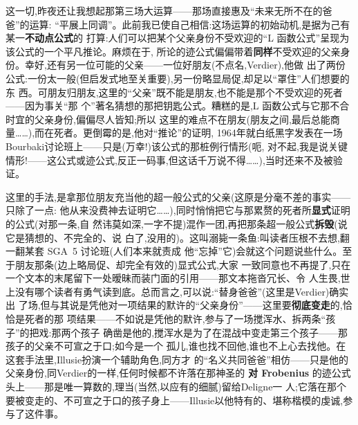 \pmark 这一切,昨夜还让我想起那第三场大运算——那场直接惠及“未来无所不在的爸爸”的运算:
“平展上同调”。此前我已使自己相信:这场运算的初始动机,是据为己有某一\textbf{不动点公式}的
打算:人们可以把某个父亲身份不受欢迎的“L 函数公式”呈现为该公式的一个平凡推论。麻烦在于,
所论的迹\dmark{}公式偏偏带着\textbf{同样}不受欢迎的父亲身份。幸好,还有另一位可能的父亲——一位好朋友(不点名,Verdier),他做
出了两份公式:一份太一般(但启发式地至关重要),另一份略显局促,却足以“罩住”人们想要的东
西。可朋友归朋友,这里的“父亲”既不能是朋友,也不能是那个不受欢迎的死者——因为事关“那
个”著名猜想的那把钥匙公式。糟糕的是,L 函数公式与它那不合时宜的父亲身份,偏偏尽人皆知;所以
这里的难点不在朋友(朋友之间,最后总能商量……),而在死者。更倒霉的是,他对“推论”的证明,
1964年就白纸黑字发表在一场Bourbaki讨论班上——只是(万幸!)该公式的那桩例行情形(呃,
对不起,我是说关键情形!——这公式或迹公式,反正一码事,但这话千万说不得……),当时还来不及被验证。

这里的手法,是拿那位朋友充当他的超一般公式的父亲(这原是分毫不差的事实——只除了一点:
他从来没费神去证明它……),同时悄悄把它与那累赘的死者所\textbf{显式}证明的公式(对那一条,自
然讳莫如深,一字不提)混作一团,再把那条超一般公式\textbf{拆毁}(说它是猜想的、不完全的、说
白了,没用的)。这叫溺毙一条鱼:叫读者压根不去想,翻一翻某套 SGA~5 讨论班(人们本来就责成
他“忘掉”它)会就这个问题说些什么。至于朋友那条(边上略局促、却完全有效的)显式公式,大家
一致同意也不再提了,只在一个文本的末尾留下一处暧昧而装门面的引用——那文本拖沓冗长、令
人生畏,世上没有哪个读者有勇气读到底。总而言之,可以说:“替身爸爸”(这里是Verdier)确实出
了场,但与其说是凭他对一项结果的默许的“父亲身份”——这里要\textbf{彻底变走}的,恰恰是\dmark{}死者的那
项结果——不如说是凭他的默许,参与了一场搅浑水、拆两条“孩子”的把戏:那两个孩子
确凿是他的,搅浑水是为了在混战中变走第三个孩子——那孩子的父亲不可宣之于口;如今是一个
孤儿,谁也找不回他,谁也不上心去找他。在这套手法里,Illusie扮演一个辅助角色,同方才
的“名义共同爸爸”相仿——只是他的父亲身份,同Verdier的一样,任何时候都不许落在那神圣的
\textbf{对 Frobenius} 的迹公式头上——那是唯一算数的,理当(当然,以应有的细腻)留给Deligne一
人;它落在那个要被变走的、不可宣之于口的孩子身上——Illusie以他特有的、堪称楷模的虔诚,参
与了这件事。

